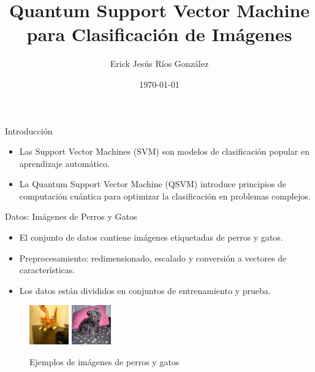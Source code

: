 \documentclass{beamer}
\title{Quantum Support Vector Machine para Clasificación de Imágenes}
\author{Erick Jesús Ríos González}
\institute{Seminario de Redes Neuronales, UNAM}
\date{\today}
\begin{document}
\begin{frame}
    \titlepage
\end{frame}

\begin{frame}{Introducción}
    \begin{itemize}
        \item Las Support Vector Machines (SVM) son modelos de clasificación popular en aprendizaje automático.
        \item La Quantum Support Vector Machine (QSVM) introduce principios de computación cuántica para optimizar la clasificación en problemas complejos.
    \end{itemize}
\end{frame}

\begin{frame}{Datos: Imágenes de Perros y Gatos}
    \begin{itemize}
        \item El conjunto de datos contiene imágenes etiquetadas de perros y gatos.
        \item Preprocesamiento: redimensionado, escalado y conversión a vectores de características.
        \item Los datos están divididos en conjuntos de entrenamiento y prueba.
    \end{itemize}
    \begin{figure}
        \includegraphics[scale=1]{../src/data/resized_images/cats/cat.0.jpg}
        \includegraphics[scale=1]{../src/data/resized_images/dogs/dog.0.jpg}
        \caption{Ejemplos de imágenes de perros y gatos}
    \end{figure}
\end{frame}
\end{document}
